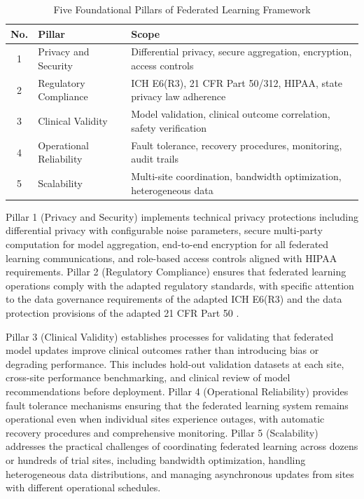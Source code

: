 \begin{table}[H]
\centering
\caption{Five Foundational Pillars of Federated Learning Framework}
\label{tab:fl-pillars}
\small
\begin{tabularx}{\textwidth}{c l X}
\toprule
\textbf{No.} & \textbf{Pillar} & \textbf{Scope} \\
\midrule
1 & Privacy and Security & Differential privacy, secure aggregation, encryption, access controls \\
2 & Regulatory Compliance & ICH E6(R3), 21 CFR Part 50/312, HIPAA, state privacy law adherence \\
3 & Clinical Validity & Model validation, clinical outcome correlation, safety verification \\
4 & Operational Reliability & Fault tolerance, recovery procedures, monitoring, audit trails \\
5 & Scalability & Multi-site coordination, bandwidth optimization, heterogeneous data \\
\bottomrule
\end{tabularx}
\end{table}

Pillar 1 (Privacy and Security) implements technical privacy protections
including differential privacy with configurable noise parameters, secure
multi-party computation for model aggregation, end-to-end encryption for all
federated learning communications, and role-based access controls aligned with
HIPAA requirements. Pillar 2 (Regulatory Compliance) ensures that federated
learning operations comply with the adapted regulatory standards, with specific
attention to the data governance requirements of the adapted ICH E6(R3)
\cite{ich-adapt} and the data protection provisions of the adapted 21 CFR
Part 50 \cite{cfr50-adapt}.

Pillar 3 (Clinical Validity) establishes processes for validating that
federated model updates improve clinical outcomes rather than introducing bias
or degrading performance. This includes hold-out validation datasets at each
site, cross-site performance benchmarking, and clinical review of model
recommendations before deployment. Pillar 4 (Operational Reliability) provides
fault tolerance mechanisms ensuring that the federated learning system remains
operational even when individual sites experience outages, with automatic
recovery procedures and comprehensive monitoring. Pillar 5 (Scalability)
addresses the practical challenges of coordinating federated learning across
dozens or hundreds of trial sites, including bandwidth optimization,
handling heterogeneous data distributions, and managing asynchronous updates
from sites with different operational schedules.

